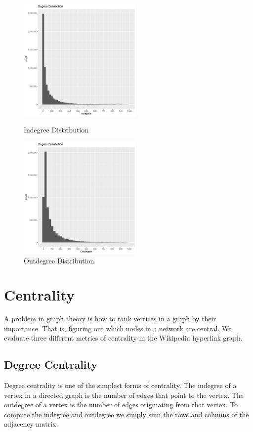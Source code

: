 \documentclass{article}
\begin{document}
\begin{figure}[H]
    \centering
    \parbox{6cm}{
    \includegraphics[width=6cm]{in_degree_dist}
    \caption{Indegree Distribution}
    \label{fig:2figsA}}
    \qquad
    \begin{minipage}{6cm}
    \includegraphics[width=6cm]{out_degree_dist}
    \caption{Outdegree Distribution}
    \label{fig:2figsB}
    \end{minipage}
\end{figure}


\section*{Centrality}

A problem in graph theory is how to rank vertices in a graph by their importance. That is, figuring out which nodes in a network are central.
We evaluate three different metrics of centrality in the Wikipedia hyperlink graph.


\subsection{Degree Centrality}

Degree centrality is one of the simplest forms of centrality.
The indegree of a vertex in a directed graph is the number of edges that point to the vertex.
The outdegree of a vertex is the number of edges originating from that vertex.
To compute the indegree and outdegree we simply sum the rows and columns of the adjacency matrix.
\end{document}
